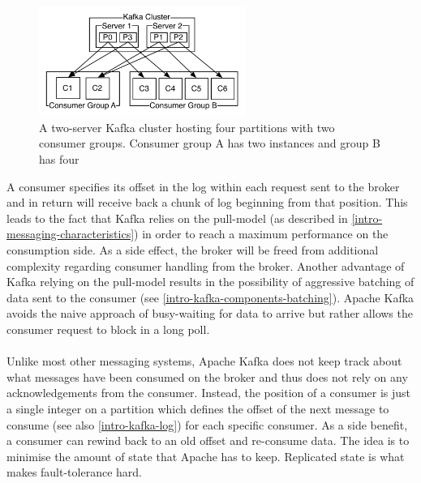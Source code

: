 \begin{figure}[H]
    \centering
    \includegraphics[width=0.6\textwidth]{images/consumer-groups.png}
    \caption{A two-server Kafka cluster hosting four partitions with two consumer groups. Consumer group A has two instances and group B has four \cite{apachekafka}}
    \label{fig:the-log}
\end{figure}

A consumer specifies its offset in the log within each request sent to the
broker and in return will receive back a chunk of log beginning from that
position. This leads to the fact that Kafka relies on the pull-model (as
described in \ref{intro-messaging-characteristics}) in order to reach a maximum
performance on the consumption side. As a side effect, the broker will be freed
from additional complexity regarding consumer handling from the broker. Another
advantage of Kafka relying on the pull-model results in the possibility of
aggressive batching of data sent to the consumer (see
\ref{intro-kafka-components-batching}). Apache Kafka avoids the naive approach
of busy-waiting for data to arrive but rather allows the consumer request to
block in a \gls{long poll}. \cite{apachekafka}
\\ \\
Unlike most other messaging systems, Apache Kafka does not keep track about what
messages have been consumed on the broker and thus does not rely on any
acknowledgements from the consumer. Instead, the position of a consumer is just
a single integer on a partition which defines the offset of the next message to
consume (see also \ref{intro-kafka-log}) for each specific consumer. As a side
benefit, a consumer can rewind back to an old offset and re-consume data. The
idea is to minimise the amount of state that Apache has to keep. Replicated state
is what makes fault-tolerance hard. \cite{apachekafka}


